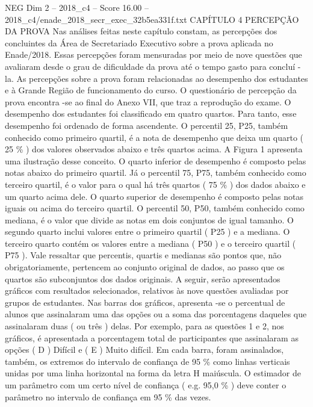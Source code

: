 \begin{textsample}{NEG Dim 2 – 2018\_c4 – Score 16.00 – 2018\_c4/enade\_2018\_secr\_exec\_32b5ea331f.txt}  \label{ex:f2_neg_384}
CAPÍTULO 4 PERCEPÇÃO DA PROVA Nas análises feitas neste capítulo constam, as percepções dos concluintes da Área de Secretariado Executivo sobre a prova aplicada no Enade/2018.
Essas percepções foram mensuradas por meio de nove questões que avaliaram desde o grau de dificuldade da prova até o tempo gasto para concluí -la.
As percepções sobre a prova foram relacionadas ao desempenho dos estudantes e à Grande Região de funcionamento do curso.
O questionário de percepção da prova encontra -se ao final do Anexo VII, que traz a reprodução do exame.
O desempenho dos estudantes foi classificado em quatro quartos.
Para tanto, esse desempenho foi ordenado de forma ascendente.
O percentil 25, P25, também conhecido como primeiro quartil, é a nota de desempenho que deixa um quarto ( 25 \% ) dos valores observados abaixo e três quartos acima.
A Figura 1 apresenta uma ilustração desse conceito.
O quarto inferior de desempenho é composto pelas notas abaixo do primeiro quartil.
Já o percentil 75, P75, também conhecido como terceiro quartil, é o valor para o qual há três quartos ( 75 \% ) dos dados abaixo e um quarto acima dele.
O quarto superior de desempenho é composto pelas notas iguais ou acima do terceiro quartil.
O percentil 50, P50, também conhecido como mediana, é o valor que divide as notas em dois conjuntos de igual tamanho.
O segundo quarto inclui valores entre o primeiro quartil ( P25 ) e a mediana.
O terceiro quarto contém os valores entre a mediana ( P50 ) e o terceiro quartil ( P75 ).
Vale ressaltar que percentis, quartis e medianas são pontos que, não obrigatoriamente, pertencem ao conjunto original de dados, ao passo que os quartos são subconjuntos dos dados originais.
A seguir, serão apresentados gráficos com resultados selecionados, relativos às nove questões avaliadas por grupos de estudantes.
Nas barras dos gráficos, apresenta -se o percentual de alunos que assinalaram uma das opções ou a soma das porcentagens daqueles que assinalaram duas ( ou três ) delas.
Por exemplo, para as questões 1 e 2, nos gráficos, é apresentada a porcentagem total de participantes que assinalaram as opções ( D ) Difícil e ( E ) Muito difícil.
Em cada barra, foram assinalados, também, os extremos do intervalo de confiança de 95 \% como linhas verticais unidas por uma linha horizontal na forma da letra H maiúscula.
O estimador de um parâmetro com um certo nível de confiança ( e.g. 95,0 \% ) deve conter o parâmetro no intervalo de confiança em 95 \% das vezes.

\end{textsample}

